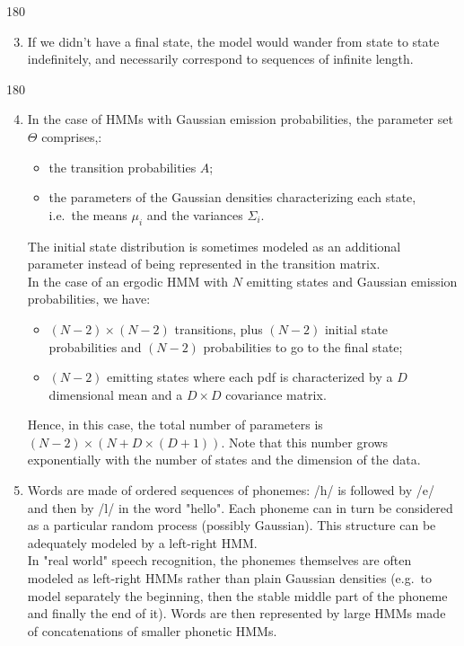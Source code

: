 \documentclass[11pt]{article}
\newenvironment{answer}{\begin{turn}{180}\begin{minipage}[t]{\linewidth}\begin{itshape}}{\end{itshape}\end{minipage}\end{turn}}
\begin{document}
\begin{answer}
\begin{enumerate}
\setcounter{enumi}{2}
\item If we didn't have a final state, the model would wander from state to
state indefinitely, and necessarily correspond to sequences of
infinite length.
\end{enumerate}
\end{answer}

\begin{answer}
\begin{enumerate}
\setcounter{enumi}{3}
\item In the case of HMMs with Gaussian emission probabilities, the
parameter set \(\Theta\) comprises,:
\begin{itemize}
\item the transition probabilities \(A\);
\item the parameters of the Gaussian densities characterizing each state,
i.e. the means \(\mu_i\) and the variances \(\Sigma_i\).
\end{itemize}
The initial state distribution is sometimes modeled as an additional
parameter instead of being represented in the transition matrix.\\
In the case of an ergodic HMM with \(N\) emitting states and Gaussian
emission probabilities, we have:\\
\begin{itemize}
\item \((N-2) \times (N-2)\) transitions, plus \((N-2)\) initial state
probabilities and \((N-2)\) probabilities to go to the final state;
\item \((N-2)\) emitting states where each pdf is characterized by a \(D\)
dimensional mean and a \(D \times D\) covariance matrix.
\end{itemize}
Hence, in this case, the total number of parameters is
\((N-2) \times \left( N + D \times (D+1) \right)\). Note that this number
grows exponentially with the number of states and the dimension of the
data.

\setcounter{enumi}{4}
\item Words are made of ordered sequences of phonemes: ​/h​/ is followed by
​/e​/ and then by ​/l​/ in the word "hello". Each phoneme can in turn be
considered as a particular random process (possibly Gaussian). This
structure can be adequately modeled by a left-right HMM.\\
In "real world" speech recognition, the phonemes themselves are often
modeled as left-right HMMs rather than plain Gaussian densities
(e.g. to model separately the beginning, then the stable middle part of
the phoneme and finally the end of it). Words are then represented by
large HMMs made of concatenations of smaller phonetic HMMs.
\end{enumerate}
\end{answer}
\end{document}
